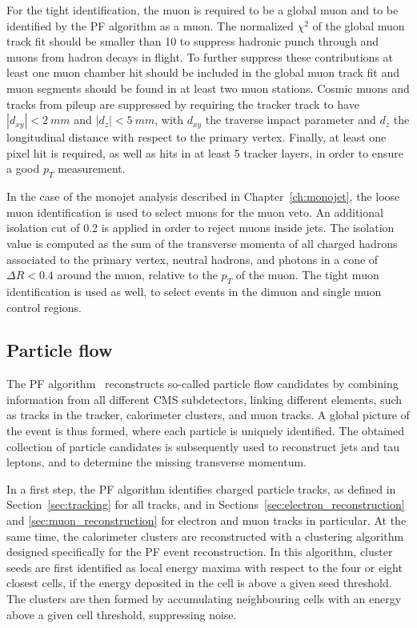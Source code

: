 For the tight identification, the muon is required to be a global muon and to be identified by the \ac{PF} algorithm as a muon. The normalized $\chi^2$ of the global muon track fit should be smaller than 10 to suppress hadronic punch through and muons from hadron decays in flight. To further suppress these contributions at least one muon chamber hit should be included in the global muon track fit and muon segments should be found in at least two muon stations. Cosmic muons and tracks from pileup are suppressed by requiring the tracker track to have $|d_{xy}| < \SI{2}{mm}$ and $|d_z| < \SI{5}{mm}$, with $d_{xy}$ the traverse impact parameter and $d_z$ the longitudinal distance with respect to the primary vertex. Finally, at least one pixel hit is required, as well as hits in at least 5 tracker layers, in order to ensure a good $p_T$ measurement.

In the case of the monojet analysis described in Chapter~\ref{ch:monojet}, the loose muon identification is used to select muons for the muon veto. An additional isolation cut of 0.2 is applied in order to reject muons inside jets. The isolation value is computed as the sum of the transverse momenta of all charged hadrons associated to the primary vertex, neutral hadrons, and photons in a cone of $\Delta R < 0.4$ around the muon, relative to the $p_T$ of the muon. The tight muon identification is used as well, to select events in the dimuon and single muon control regions. 

\subsection{Particle flow}
\label{sec:PF}

The \acf{PF} algorithm~\cite{CMS-PRF-14-001} reconstructs so-called particle flow candidates by combining information from all different \ac{CMS} subdetectors, linking different elements, such as tracks in the tracker, calorimeter clusters, and muon tracks. A global picture of the event is thus formed, where each particle is uniquely identified. The obtained collection of particle candidates is subsequently used to reconstruct jets and tau leptons, and to determine the missing transverse momentum.

In a first step, the \ac{PF} algorithm identifies charged particle tracks, as defined in Section~\ref{sec:tracking} for all tracks, and in Sections~\ref{sec:electron_reconstruction} and \ref{sec:muon_reconstruction} for electron and muon tracks in particular. At the same time, the calorimeter clusters are reconstructed with a clustering algorithm designed specifically for the \ac{PF} event reconstruction. In this algorithm, cluster seeds are first identified as local energy maxima with respect to the four or eight closest cells, if the energy deposited in the cell is above a given seed threshold. The clusters are then formed by accumulating neighbouring cells with an energy above a given cell threshold, suppressing noise.


